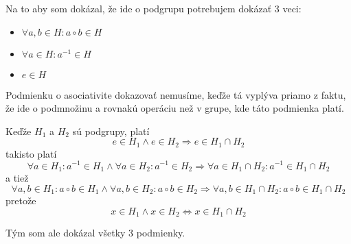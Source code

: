 
Na to aby som dokázal, že ide o podgrupu potrebujem dokázať 3 veci:
\begin{itemize}
    \item $\forall a,b\in H: a\circ b\in H$
    \item $\forall a\in H: a^{-1}\in H$
    \item $e\in H$
\end{itemize}
Podmienku o asociativite dokazovať nemusíme, keďže tá vyplýva priamo 
z faktu, že ide o podmnožinu a rovnakú operáciu než v grupe, kde táto 
podmienka platí.

Keďže $H_1$ a $H_2$ sú podgrupy, platí 
$$e\in H_1\wedge e\in H_2\Rightarrow e\in H_1\cap H_2$$
takisto platí
$$\forall a\in H_1: a^{-1}\in H_1\wedge\forall a\in H_2: a^{-1}\in H_2
\Rightarrow\forall a\in H_1\cap H_2: a^{-1}\in H_1\cap H_2$$
a tiež
$$\forall a,b\in H_1: a\circ b\in H_1\wedge
\forall a,b\in H_2: a\circ b\in H_2
\Rightarrow\forall a,b\in H_1\cap H_2: a\circ b\in H_1\cap H_2$$
pretože
$$x\in H_1\wedge x\in H_2\Leftrightarrow x\in H_1\cap H_2$$

Tým som ale dokázal všetky 3 podmienky. 

